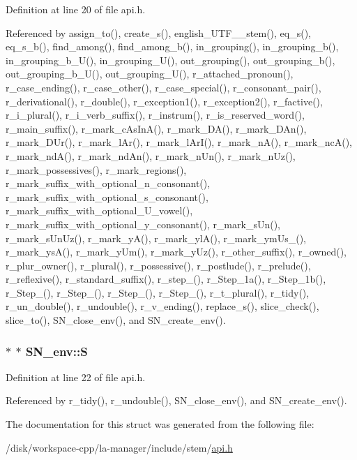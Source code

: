 Definition at line 20 of file api.h.

Referenced by assign\_\-to(), create\_\-s(), english\_\-UTF\_\_\-stem(), eq\_\-s(), eq\_\-s\_\-b(), find\_\-among(), find\_\-among\_\-b(), in\_\-grouping(), in\_\-grouping\_\-b(), in\_\-grouping\_\-b\_\-U(), in\_\-grouping\_\-U(), out\_\-grouping(), out\_\-grouping\_\-b(), out\_\-grouping\_\-b\_\-U(), out\_\-grouping\_\-U(), r\_\-attached\_\-pronoun(), r\_\-case\_\-ending(), r\_\-case\_\-other(), r\_\-case\_\-special(), r\_\-consonant\_\-pair(), r\_\-derivational(), r\_\-double(), r\_\-exception1(), r\_\-exception2(), r\_\-factive(), r\_\-i\_\-plural(), r\_\-i\_\-verb\_\-suffix(), r\_\-instrum(), r\_\-is\_\-reserved\_\-word(), r\_\-main\_\-suffix(), r\_\-mark\_\-cAsInA(), r\_\-mark\_\-DA(), r\_\-mark\_\-DAn(), r\_\-mark\_\-DUr(), r\_\-mark\_\-lAr(), r\_\-mark\_\-lArI(), r\_\-mark\_\-nA(), r\_\-mark\_\-ncA(), r\_\-mark\_\-ndA(), r\_\-mark\_\-ndAn(), r\_\-mark\_\-nUn(), r\_\-mark\_\-nUz(), r\_\-mark\_\-possessives(), r\_\-mark\_\-regions(), r\_\-mark\_\-suffix\_\-with\_\-optional\_\-n\_\-consonant(), r\_\-mark\_\-suffix\_\-with\_\-optional\_\-s\_\-consonant(), r\_\-mark\_\-suffix\_\-with\_\-optional\_\-U\_\-vowel(), r\_\-mark\_\-suffix\_\-with\_\-optional\_\-y\_\-consonant(), r\_\-mark\_\-sUn(), r\_\-mark\_\-sUnUz(), r\_\-mark\_\-yA(), r\_\-mark\_\-ylA(), r\_\-mark\_\-ymUs\_\-(), r\_\-mark\_\-ysA(), r\_\-mark\_\-yUm(), r\_\-mark\_\-yUz(), r\_\-other\_\-suffix(), r\_\-owned(), r\_\-plur\_\-owner(), r\_\-plural(), r\_\-possessive(), r\_\-postlude(), r\_\-prelude(), r\_\-reflexive(), r\_\-standard\_\-suffix(), r\_\-step\_(), r\_\-Step\_\-1a(), r\_\-Step\_\-1b(), r\_\-Step\_(), r\_\-Step\_(), r\_\-Step\_(), r\_\-Step\_(), r\_\-t\_\-plural(), r\_\-tidy(), r\_\-un\_\-double(), r\_\-undouble(), r\_\-v\_\-ending(), replace\_\-s(), slice\_\-check(), slice\_\-to(), SN\_\-close\_\-env(), and SN\_\-create\_\-env().\hypertarget{structSN__env_ef140037972032bceeebebf53cc53d68}{
\subsubsection[{S}]{$\ast$ $\ast$ {\bf SN\_\-env::S}}}
\label{structSN__env_ef140037972032bceeebebf53cc53d68}




Definition at line 22 of file api.h.

Referenced by r\_\-tidy(), r\_\-undouble(), SN\_\-close\_\-env(), and SN\_\-create\_\-env().

The documentation for this struct was generated from the following file:\begin{CompactItemize}
\item 
/disk/workspace-cpp/la-manager/include/stem/\hyperlink{api_8h}{api.h}\end{CompactItemize}

